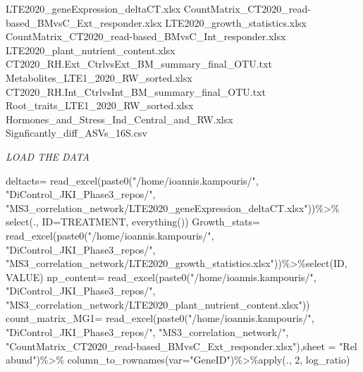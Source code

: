 \documentclass[
]{article}
\newenvironment{Shaded}{\begin{snugshade}}{\end{snugshade}}
\newcommand{\AttributeTok}[1]{\textcolor[rgb]{0.77,0.63,0.00}{#1}}
\newcommand{\DecValTok}[1]{\textcolor[rgb]{0.00,0.00,0.81}{#1}}
\newcommand{\FunctionTok}[1]{\textcolor[rgb]{0.00,0.00,0.00}{#1}}
\newcommand{\NormalTok}[1]{#1}
\newcommand{\OtherTok}[1]{\textcolor[rgb]{0.56,0.35,0.01}{#1}}
\newcommand{\SpecialCharTok}[1]{\textcolor[rgb]{0.00,0.00,0.00}{#1}}
\newcommand{\StringTok}[1]{\textcolor[rgb]{0.31,0.60,0.02}{#1}}
\begin{document}
LTE2020\_geneExpression\_deltaCT.xlsx
CountMatrix\_CT2020\_read-based\_BMvsC\_Ext\_responder.xlsx
LTE2020\_growth\_statistics.xlsx
CountMatrix\_CT2020\_read-based\_BMvsC\_Int\_responder.xlsx
LTE2020\_plant\_nutrient\_content.xlsx
CT2020\_RH.Ext\_CtrlvsExt\_BM\_summary\_final\_OTU.txt
Metabolites\_LTE1\_2020\_RW\_sorted.xlsx
CT2020\_RH.Int\_CtrlvsInt\_BM\_summary\_final\_OTU.txt
Root\_traits\_LTE1\_2020\_RW\_sorted.xlsx
Hormones\_and\_Stress\_Ind\_Central\_and\_RW.xlsx
Signficantly\_diff\_ASVs\_16S.csv

\emph{LOAD THE DATA}

\begin{Shaded}
\begin{Highlighting}[]
\NormalTok{deltacts}\OtherTok{=} \FunctionTok{read\_excel}\NormalTok{(}\FunctionTok{paste0}\NormalTok{(}\StringTok{"/home/ioannis.kampouris/"}\NormalTok{,}
\StringTok{"DiControl\_JKI\_Phase3\_repos/"}\NormalTok{,}
\StringTok{"MS3\_correlation\_network/LTE2020\_geneExpression\_deltaCT.xlsx"}\NormalTok{))}\SpecialCharTok{\%\textgreater{}\%} 
  \FunctionTok{select}\NormalTok{(., }\AttributeTok{ID=}\NormalTok{TREATMENT, }\FunctionTok{everything}\NormalTok{())}
\NormalTok{Growth\_stats}\OtherTok{=} \FunctionTok{read\_excel}\NormalTok{(}\FunctionTok{paste0}\NormalTok{(}\StringTok{"/home/ioannis.kampouris/"}\NormalTok{,}
\StringTok{"DiControl\_JKI\_Phase3\_repos/"}\NormalTok{,}
\StringTok{"MS3\_correlation\_network/LTE2020\_growth\_statistics.xlsx"}\NormalTok{))}\SpecialCharTok{\%\textgreater{}\%}\FunctionTok{select}\NormalTok{(ID, VALUE)}
\NormalTok{np\_content}\OtherTok{=} \FunctionTok{read\_excel}\NormalTok{(}\FunctionTok{paste0}\NormalTok{(}\StringTok{"/home/ioannis.kampouris/"}\NormalTok{,}
\StringTok{"DiControl\_JKI\_Phase3\_repos/"}\NormalTok{,}
\StringTok{"MS3\_correlation\_network/LTE2020\_plant\_nutrient\_content.xlsx"}\NormalTok{))}
\NormalTok{count\_matrix\_MG1}\OtherTok{=} \FunctionTok{read\_excel}\NormalTok{(}\FunctionTok{paste0}\NormalTok{(}\StringTok{"/home/ioannis.kampouris/"}\NormalTok{,}
\StringTok{"DiControl\_JKI\_Phase3\_repos/"}\NormalTok{,}
\StringTok{"MS3\_correlation\_network/"}\NormalTok{,}
\StringTok{"CountMatrix\_CT2020\_read{-}based\_BMvsC\_Ext\_responder.xlsx"}\NormalTok{),}\AttributeTok{sheet =} \StringTok{"Rel abund"}\NormalTok{)}\SpecialCharTok{\%\textgreater{}\%}
  \FunctionTok{column\_to\_rownames}\NormalTok{(}\AttributeTok{var=}\StringTok{"GeneID"}\NormalTok{)}\SpecialCharTok{\%\textgreater{}\%}\FunctionTok{apply}\NormalTok{(., }\DecValTok{2}\NormalTok{, log\_ratio)}

\end{Highlighting}
\end{Shaded}
\end{document}
